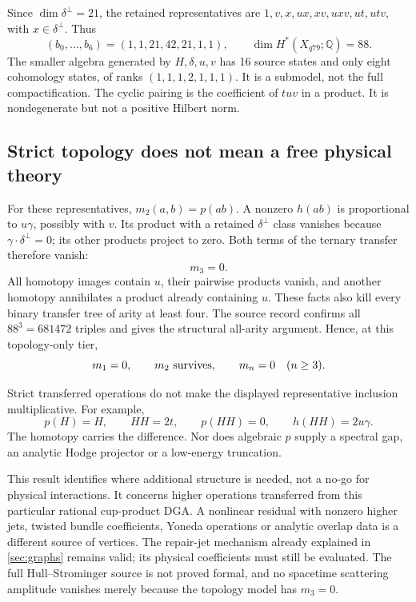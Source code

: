 \documentclass[11pt,a4paper]{article}
\begin{document}
Since \(\dim\delta^\perp=21\), the retained representatives are
\(1,v,x,ux,xv,uxv,ut,utv\), with \(x\in\delta^\perp\). Thus
\[
 (b_0,\ldots,b_6)=(1,1,21,42,21,1,1),\qquad
 \dim H^*(X_{q79};\mathbb Q)=88.
\]
The smaller algebra generated by \(H,\delta,u,v\) has 16 source states
and only eight cohomology states, of ranks \((1,1,1,2,1,1,1)\).
It is a submodel, not the full compactification.
The cyclic pairing is the coefficient of \(tuv\) in a product.
It is nondegenerate but not a positive Hilbert norm.

\subsection{Strict topology does not mean a free physical theory}
\label{sec:q79-hirsch-interactions}
For these representatives, \(m_2(a,b)=p(ab)\). A nonzero
\(h(ab)\) is proportional to \(u\gamma\), possibly with \(v\).
Its product with a retained \(\delta^\perp\) class vanishes because
\(\gamma\cdot\delta^\perp=0\); its other products project to zero.
Both terms of the ternary transfer therefore vanish:
\[
 m_3=0.
\]
All homotopy images contain \(u\), their pairwise products vanish, and
another homotopy annihilates a product already containing \(u\).
These facts also kill every binary transfer tree of arity at least four.
The source record confirms all \(88^3=681472\) triples and gives the
structural all-arity argument. Hence, at this topology-only tier,
\[
 m_1=0,\qquad m_2\ \hbox{survives},\qquad m_n=0\quad(n\geq3).
\]

Strict transferred operations do not make the displayed representative
inclusion multiplicative. For example,
\[
 p(H)=H,\qquad H H=2t,\qquad p(HH)=0,\qquad h(HH)=2u\gamma .
\]
The homotopy carries the difference. Nor does algebraic \(p\) supply a
spectral gap, an analytic Hodge projector or a low-energy truncation.

This result identifies where additional structure is needed, not a no-go
for physical interactions. It concerns higher operations transferred from
this particular rational cup-product DGA. A nonlinear residual with
nonzero higher jets, twisted bundle coefficients, Yoneda operations or
analytic overlap data is a different source of vertices. The repair-jet
mechanism already explained in \cref{sec:graphs} remains valid; its physical
coefficients must still be evaluated. The full Hull--Strominger source is
not proved formal, and no spacetime scattering amplitude vanishes merely
because the topology model has \(m_3=0\).
\end{document}
